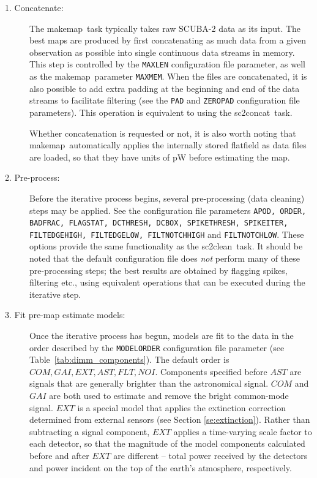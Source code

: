 \documentclass[twoside,11pt]{article}
\newcommand{\xref}[3]{#1}
\renewcommand{\_}{\texttt{\symbol{95}}}
\newcommand{\task}[1]{\textsf{#1}}
\newcommand{\makemap}{\xref{\task{makemap}}{sun258}{MAKEMAP}}
\newcommand{\clean}{\xref{\task{sc2clean}}{sun258}{SC2CLEAN}}
\newcommand{\concat}{\xref{\task{sc2concat}}{sun258}{SC2CONCAT}}
\newcommand{\aparam}[1]{\texttt{#1}}     %
\newcommand{\cparam}[1]{\texttt{#1}}     %
\begin{document}
\begin{description}

\item[1. Concatenate:] The \makemap\ task typically takes raw SCUBA-2
  data as its input. The best maps are produced by first concatenating
  as much data from a given observation as possible into single
  continuous data streams in memory. This step is controlled by the
  \cparam{MAXLEN} configuration file parameter, as well as the \makemap\
  parameter \aparam{MAXMEM}. When the files are concatenated, it is
  also possible to add extra padding at the beginning and end of the
  data streams to facilitate filtering (see the \cparam{PAD} and
  \cparam{ZEROPAD} configuration file parameters). This operation is
  equivalent to using the \concat\ task.

  Whether concatenation is requested or not, it is also worth noting
  that \makemap\ automatically applies the internally stored flatfield
  as data files are loaded, so that they have units of pW before
  estimating the map.

\item[2. Pre-process:] Before the iterative process begins, several
  pre-processing (data cleaning) steps may be applied. See the
  configuration file parameters \cparam{APOD, ORDER, BADFRAC,
    FLAGSTAT, DCTHRESH, DCBOX, SPIKETHRESH, SPIKEITER, FILT\_EDGEHIGH,
    FILT\_EDGELOW, FILT\_NOTCHHIGH} and \cparam{FILT\_NOTCHLOW}. These
  options provide the same functionality as the \clean\ task. It
  should be noted that the default configuration file does {\em not}
  perform many of these pre-processing steps; the best results are
  obtained by flagging spikes, filtering etc., using equivalent
  operations that can be executed during the iterative step.

\item[3. Fit pre-map estimate models:] Once the iterative process has
  begun, models are fit to the data in the order described by the
  \cparam{MODELORDER} configuration file parameter (see
  Table~\ref{tab:dimm_components}). The default order is $COM, GAI,
  EXT, AST, FLT, NOI$. Components specified before $AST$ are signals
  that are generally brighter than the astronomical signal. $COM$ and
  $GAI$ are both used to estimate and remove the bright common-mode
  signal. $EXT$ is a special model that applies the extinction
  correction determined from external sensors (see Section
  \ref{se:extinction}). Rather than subtracting a signal component,
  $EXT$ applies a time-varying scale factor to each detector, so that
  the magnitude of the model components calculated before and after
  $EXT$ are different -- total power received by the detectors and
  power incident on the top of the earth's atmosphere, respectively.


\end{description}
\end{document}
